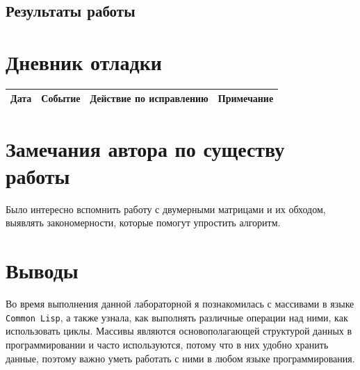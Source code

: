 \documentclass[12pt]{article}
\begin{document}
\subsection{Результаты работы}


\section{Дневник отладки}
\begin{tabular}{|c|c|c|c|}
\hline
Дата & Событие & Действие по исправлению & Примечание \\
\hline
\end{tabular}

\section{Замечания автора по существу работы}
Было интересно вспомнить работу с двумерными матрицами и их обходом, выявлять закономерности, которые помогут упростить алгоритм.

\section{Выводы}
Во время выполнения данной лабораторной я познакомилась с массивами в языке {\tt Common Lisp}, а также узнала, как выполнять различные операции над ними, как использовать циклы. Массивы являются основополагающей структурой данных в программировании и часто используются, потому что в них удобно хранить данные, поэтому важно уметь работать с ними в любом языке программирования.
\end{document}
